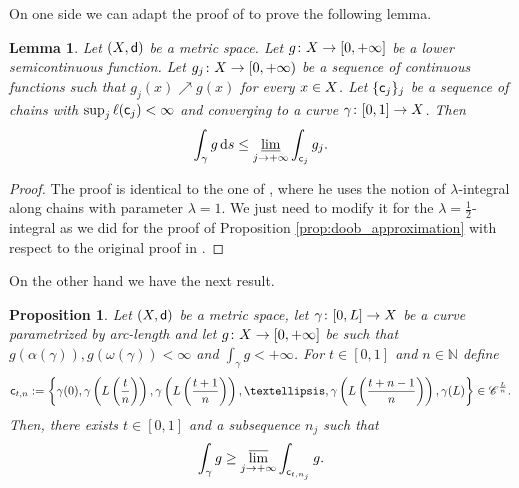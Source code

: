 \documentclass[12pt]{amsart}
\newcommand{\N}{\mathbb{N}}
\newcommand{\sfd}{{\sf d}}
\renewcommand{\d}{{\mathrm d}}
\newcommand{\limi}{\varliminf}
\newcommand{\lims}{\varlimsup}
\newcommand{\X}{{\rm X}}
\newtheorem{lemma}[theorem]{Lemma}
\newtheorem{proposition}[theorem]{Proposition}
\theoremstyle{definition}
\newcommand{\sfc}{{\sf c}}
\newcommand{\Chain}[1]{\mathscr{C}^{#1}}
\begin{document}
On one side we can adapt the proof of \cite[Lemma 2.19]{Eriksson-Bique-Density-in-energy} to prove the following lemma.
\begin{lemma}
    \label{lemma:lower-semicontinuity-integral-chains-convergence}
    Let $(\X,\sfd)$ be a metric space.
    Let $g \colon \X \to [0,+\infty]$ be a lower semicontinuous function. Let $g_j \colon \X \to [0,+\infty)$ be a sequence of continuous functions such that $g_j(x) \nearrow g(x)$ for every $x\in \X$. Let $\{\sfc_j\}_j$ be a sequence of chains with $\sup_j \ell(\sfc_j) <\infty$ and converging to a curve $\gamma\colon [0,1] \to \X$. Then
    $$ \int_\gamma g \,\d s \le \limi_{j\to +\infty} \int_{\sfc_j} g_j.$$
\end{lemma}
\begin{proof}
    The proof is identical to the one of \cite[Lemma 2.19]{Eriksson-Bique-Density-in-energy}, where he uses the notion of $\lambda$-integral along chains with parameter $\lambda = 1$.
    We just need to modify it for the $\lambda = \frac12$-integral as we did for the proof of Proposition \ref{prop:doob_approximation} with respect to the original proof in \cite{Doob90}.
\end{proof}

On the other hand we have the next result.
\begin{proposition}
\label{prop:approx_integral_curve_with_subchains}
    Let $(\X,\sfd)$ be a metric space, let $\gamma\colon [0,L] \to \X$ be a curve parametrized by arc-length and let $g\colon \X \to [0,+\infty]$ be such that $g(\alpha(\gamma)), g(\omega(\gamma)) < \infty$ and $\int_\gamma g < +\infty$. For $t\in [0,1]$ and $n\in \N$ define
    \begin{equation}
    \sfc_{t,n} := \left\{\gamma(0), \gamma\left(L\left(\frac{t}{n}\right)\right), \gamma\left(L\left(\frac{t + 1}{n}\right)\right), \ldots, \gamma\left(L\left(\frac{t + n - 1}{n}\right)\right), \gamma(L) \right\} \in \Chain{\frac{L}{n}}.
\end{equation}
    Then, there exists $t\in [0,1]$ and a subsequence $n_j$ such that
    $$\int_\gamma g \ge \lims_{j\to +\infty} \int_{\sfc_{t,n_j}}g.$$
\end{proposition}
\end{document}
